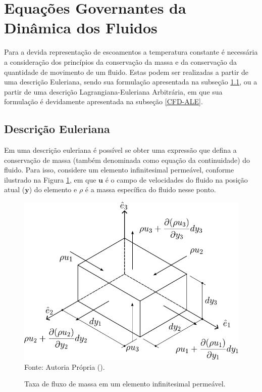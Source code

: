 \documentclass[_ArquivoPrincipal.tex]{subfiles}
\begin{document}
\section{Equações Governantes da Dinâmica dos Fluidos} \label{EGDF}

Para a devida representação de escoamentos a temperatura constante é necessária a consideração dos princípios da conservação da massa e da conservação da quantidade de movimento de um fluido. Estas podem ser realizadas a partir de uma descrição Euleriana, sendo sua formulação apresentada na subseção \ref{CFD-E}, ou a partir de uma descrição Lagrangiana-Euleriana Arbitrária, em que sua formulação é devidamente apresentada na subseção \ref{CFD-ALE}.

\subsection{Descrição Euleriana} \label{CFD-E}

Em uma descrição euleriana é possível se obter uma expressão que defina a conservação de massa (também denominada como equação da continuidade) do fluido. Para isso, considere um elemento infinitesimal permeável, conforme ilustrado na Figura \ref{fig:BalMas}, em que $\mathbf{u}$ é o campo de velocidades do fluido na posição atual ($\mathbf{y}$) do elemento e $\rho$ é a massa específica do fluido nesse ponto.

\begin{figure}[h]
    \centering
    \caption{Taxa de fluxo de massa em um elemento infinitesimal permeável.}
    \includegraphics[width=.5\linewidth]{Figuras/BalMas.pdf}
    \\Fonte: Autoria Própria (\the\year).
    \label{fig:BalMas}
\end{figure}
\end{document}
